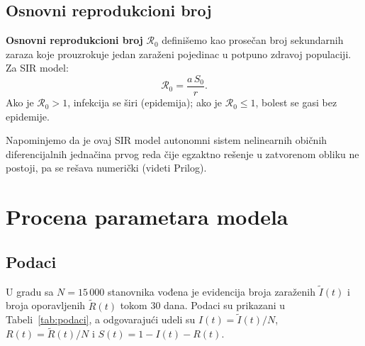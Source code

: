 \documentclass[12pt,a4paper]{article}
\begin{document}
	\subsection{Osnovni reprodukcioni broj}
	
	\textbf{Osnovni reprodukcioni broj} $\mathcal{R}_0$ definišemo kao prosečan broj sekundarnih
	zaraza koje prouzrokuje jedan zaraženi pojedinac u potpuno zdravoj populaciji. Za SIR model:
	\begin{equation}
		\mathcal{R}_0 = \frac{a\,S_0}{r}.
		\label{eq:R0def}
	\end{equation}
	Ako je $\mathcal{R}_0 > 1$, infekcija se širi (epidemija); ako je $\mathcal{R}_0 \leq 1$, bolest
	se gasi bez epidemije.
	
	Napominjemo da je ovaj SIR model autonomni sistem nelinearnih običnih diferencijalnih jednačina prvog reda čije egzaktno
	rešenje u zatvorenom obliku ne postoji, pa se rešava numerički (videti Prilog).
	
	\section{Procena parametara modela}
	\label{sec:params}
	
	\subsection{Podaci}
	
	U gradu sa $N=15\,000$ stanovnika vođena je evidencija broja zaraženih $\tilde{I}(t)$ i broja
	oporavljenih $\tilde{R}(t)$ tokom 30 dana. Podaci su prikazani u Tabeli~\ref{tab:podaci},
	a odgovarajući udeli su $I(t)=\tilde{I}(t)/N$, $R(t)=\tilde{R}(t)/N$ i $S(t)=1-I(t)-R(t)$.
	
\end{document}
